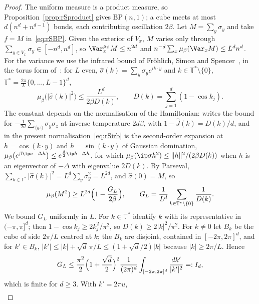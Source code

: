\begin{proof}
The uniform measure is a product measure, so Proposition~\ref{prop:rSproduct}
gives $\mathrm{BP}(n,1)$; a cube meets at most $d(n^d+n^{d-1})$ bonds, each
contributing oscillation $2\beta$. Let $M=\sum_y\sigma_y$ and take $f=M$
in~\eqref{eq:rSBP}. Given the exterior of $V_x$, $M$ varies only through
$\sum_{y\in V_x}\sigma_y\in[-n^d,n^d]$, so $\Var_x^{\mu_\beta}M\le n^{2d}$
and $n^{-d}\sum_x\mu_\beta(\Var_xM)\le L^dn^d$. For the variance we use the
infrared bound of Fr\"ohlich, Simon and Spencer~\cite{FSS76}, in the torus
form of~\cite[Theorem~3.3 and Corollary~3.4]{Bis09}: for $L$ even,
$\hat\sigma(k)=\sum_y\sigma_ye^{ik\cdot y}$ and $k\in\mathbb T^*\setminus\{0\}$,
$\mathbb T^*=\frac{2\pi}L\{0,\dots,L-1\}^d$,
\begin{equation}\label{eq:rSirb}
\mu_\beta\bigl(\lvert\hat\sigma(k)\rvert^2\bigr)\le\frac{L^d}{2\beta D(k)},
\qquad D(k)=\sum_{j=1}^d(1-\cos k_j).
\end{equation}
The constant depends on the normalisation of the Hamiltonian: \cite{Bis09}
writes the bound for $-\frac1{2d}\sum_{\langle yz\rangle}\sigma_y\sigma_z$ at
inverse temperature $2d\beta$, with $1-\hat J(k)=D(k)/d$, and in the present
normalisation~\eqref{eq:rSirb} is the second-order expansion at $h=\cos(k
\cdot y)$ and $h=\sin(k\cdot y)$ of Gaussian domination, $\mu_\beta\bigl(
e^{\beta\ip\sigma{-\Delta h}}\bigr)\le e^{\frac\beta2\ip h{-\Delta h}}$, for
which $\mu_\beta(\ip\sigma h^2)\le\lVert h\rVert^2/(2\beta D(k))$ when $h$
is an eigenvector of $-\Delta$ with eigenvalue $2D(k)$. By Parseval,
$\sum_{k\in\mathbb T^*}\lvert\hat\sigma(k)\rvert^2=L^d\sum_y\sigma_y^2=L^{2d}$,
and $\hat\sigma(0)=M$, so
\begin{gather*}
\mu_\beta(M^2)\ge L^{2d}\Bigl(1-\frac{G_L}{2\beta}\Bigr),\qquad
G_L=\frac1{L^d}\sum_{k\in\mathbb T^*\setminus\{0\}}\frac1{D(k)}.
\end{gather*}
We bound $G_L$ uniformly in $L$. For $k\in\mathbb T^*$ identify $k$ with
its representative in $(-\pi,\pi]^d$; then $1-\cos k_j\ge2k_j^2/\pi^2$, so
$D(k)\ge2\lvert k\rvert^2/\pi^2$. For $k\ne0$ let $B_k$ be the cube of side
$2\pi/L$ centred at $k$; the $B_k$ are disjoint, contained in $[-2\pi,2\pi]^d$,
and for $k'\in B_k$, $\lvert k'\rvert\le\lvert k\rvert+\sqrt d\,\pi/L\le(1+
\sqrt d/2)\lvert k\rvert$ because $\lvert k\rvert\ge2\pi/L$. Hence
\[
G_L\le\frac{\pi^2}2\Bigl(1+\frac{\sqrt d}2\Bigr)^2\frac1{(2\pi)^d}\int_{[-2
\pi,2\pi]^d}\frac{dk'}{\lvert k'\rvert^2}=:I_d,
\]
which is finite for $d\ge3$. With $k'=2\pi u$,
\begin{gather*}

\end{gather*}
\end{proof}
